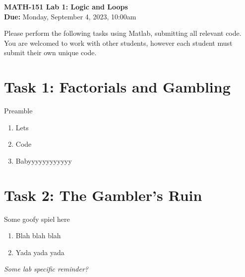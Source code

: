 \documentclass[11pt]{article}
\begin{document}
	
	\begin{center}
		\Large{\textbf{MATH-151 Lab 1: Logic and Loops}}\\
			\medskip
		\normalsize{\textbf{Due:} Monday, September 4, 2023, 10:00am} 
	\end{center}
	\noindent\makebox[\linewidth]{\rule{\textwidth}{0.4pt}}
	Please perform the following tasks using Matlab, submitting all relevant code. You are welcomed to work with other students, however each student must submit their own unique code.
	\section*{Task 1: Factorials and Gambling}
	\noindent Preamble
	\begin{enumerate}[label=\alph*)]
		\item Lets
		\item Code
		\item Babyyyyyyyyyyyy
	\end{enumerate}
	\section*{Task 2: The Gambler's Ruin}
	\noindent Some goofy spiel here\\
	\begin{enumerate}[label=\alph*)]
		\item Blah blah blah
		\item Yada yada yada 
	\end{enumerate}

	\begin{center}
		\vfill
		\textit{Some lab specific reminder?}
	\end{center}
\end{document}
